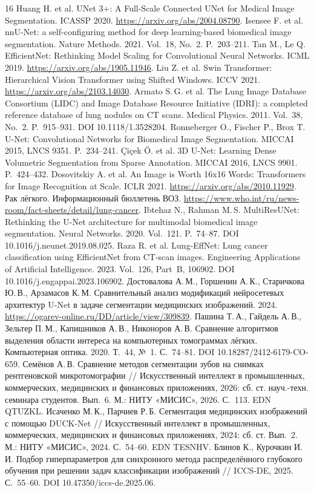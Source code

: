 \documentclass{misisarticle}
\begin{document}
\begin{thebibliography}{16}
 Huang H. et al. UNet 3+: A Full-Scale Connected UNet for Medical Image Segmentation. ICASSP 2020. \url{https://arxiv.org/abs/2004.08790}.
 Isensee F. et al. nnU-Net: a self-configuring method for deep learning-based biomedical image segmentation. Nature Methods. 2021. Vol.~18, No.~2. P.~203–211.
 Tan M., Le Q. EfficientNet: Rethinking Model Scaling for Convolutional Neural Networks. ICML 2019. \url{https://arxiv.org/abs/1905.11946}.
 Liu Z. et al. Swin Transformer: Hierarchical Vision Transformer using Shifted Windows. ICCV 2021. \url{https://arxiv.org/abs/2103.14030}.
 Armato S.\,G. et al. The Lung Image Database Consortium (LIDC) and Image Database Resource Initiative (IDRI): a completed reference database of lung nodules on CT scans. Medical Physics. 2011. Vol.~38, No.~2. P.~915–931. DOI 10.1118/1.3528204.
 Ronneberger O., Fischer P., Brox T. U-Net: Convolutional Networks for Biomedical Image Segmentation. MICCAI 2015, LNCS 9351. P.~234–241.
 Çiçek Ö. et al. 3D U-Net: Learning Dense Volumetric Segmentation from Sparse Annotation. MICCAI 2016, LNCS 9901. P.~424–432.
 Dosovitskiy A. et al. An Image is Worth 16x16 Words: Transformers for Image Recognition at Scale. ICLR 2021. \url{https://arxiv.org/abs/2010.11929}.
 Рак лёгкого. Информационный бюллетень ВОЗ. \url{https://www.who.int/ru/news-room/fact-sheets/detail/lung-cancer}.
 Ibtehaz N., Rahman M.\,S. MultiResUNet: Rethinking the U-Net architecture for multimodal biomedical image segmentation. Neural Networks. 2020. Vol.~121. P.~74–87. DOI 10.1016/j.neunet.2019.08.025.
 Raza R. et al. Lung-EffNet: Lung cancer classification using EfficientNet from CT-scan images. Engineering Applications of Artificial Intelligence. 2023. Vol.~126, Part~B, 106902. DOI 10.1016/j.engappai.2023.106902.
 Достовалова А.\,М., Горшенин А.\,К., Старичкова Ю.\,В., Арзамасов К.\,М. Сравнительный анализ модификаций нейросетевых архитектур U-Net в задаче сегментации медицинских изображений. 2024. \url{https://ogarev-online.ru/DD/article/view/309839}.
 Пашина Т.\,А., Гайдель А.\,В., Зельтер П.\,М., Капишников А.\,В., Никоноров А.\,В. Сравнение алгоритмов выделения области интереса на компьютерных томограммах лёгких. Компьютерная оптика. 2020. Т.~44, №~1. С.~74–81. DOI 10.18287/2412-6179-CO-659.
 Семёнов А.\,В. Сравнение методов сегментации зубов на снимках рентгеновской микротомографии // Искусственный интеллект в промышленных, коммерческих, медицинских и финансовых приложениях, 2026: сб. ст. науч.-техн. семинара студентов. Вып.~6. М.: НИТУ «МИСИС», 2026. С.~113. EDN QTUZKL.
 Исаченко М.\,К., Парчиев Р.\,Б. Сегментация медицинских изображений с помощью DUCK-Net // Искусственный интеллект в промышленных, коммерческих, медицинских и финансовых приложениях, 2024: сб. ст. Вып.~2. М.: НИТУ «МИСИС», 2024. С.~54–60. EDN TESNHV.
 Блинов К., Курочкин И.\,И. Подбор гиперпараметров для синхронного метода распределённого глубокого обучения при решении задач классификации изображений // ICCS-DE, 2025. С.~55–60. DOI 10.47350/iccs-de.2025.06.
\end{thebibliography}
\end{document}
